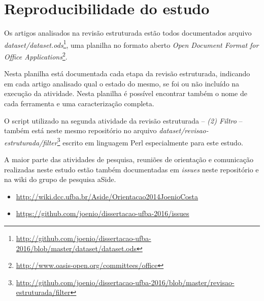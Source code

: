 \section{Reproducibilidade do estudo}
\label{reproducibilidade-do-estudo}

Os artigos analisados na revisão estruturada estão todos documentados arquivo
{\it
dataset/dataset.ods}\footnote{\url{http://github.com/joenio/dissertacao-ufba-2016/blob/master/dataset/dataset.ods}},
uma planilha no formato aberto {\it Open Document Format for Office
Applications}\footnote{\url{http://www.oasis-open.org/committees/office}}.

Nesta planilha está documentada cada etapa da revisão estruturada, indicando em
cada artigo analisado qual o estado do mesmo, se foi ou não incluído na
execução da atividade.  Nesta planilha é possível encontrar também o nome de
cada ferramenta e uma caracterização completa.

O script utilizado na segunda atividade da revisão estruturada -- {\it (2)
Filtro} -- também está neste mesmo repositório no arquivo {\it
dataset/revisao-estruturada/filter}\footnote{\url{http://github.com/joenio/dissertacao-ufba-2016/blob/master/revisao-estruturada/filter}}
escrito em linguagem Perl especialmente para este estudo.

A maior parte das atividades de pesquisa, reuniões de orientação e comunicação
realizadas neste estudo estão também documentadas em {\it issues} neste
repositório e na wiki do grupo de pesquisa aSide.

\begin{itemize}
  \item \url{http://wiki.dcc.ufba.br/Aside/Orientacao2014JoenioCosta}
  \item \url{https://github.com/joenio/dissertacao-ufba-2016/issues}
\end{itemize}



